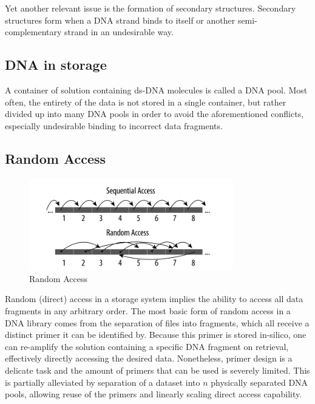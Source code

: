 \documentclass[a4paper,conference]{IEEEtran}
\begin{document}
Yet another relevant issue is the formation of secondary structures. Secondary structures form when a DNA strand binds to itself or another semi-complementary strand in an undesirable way.

\subsection{DNA in storage}
A container of solution containing ds-DNA molecules is called a DNA pool. Most often, the entirety of the data is not stored in a single container, but rather divided up into many DNA pools in order to avoid the aforementioned conflicts, especially undesirable binding to incorrect data fragments.

\subsection{Random Access}
\begin{figure}
\centering
\includegraphics[width=3.5in]{randomaccess}
\caption{Random Access}
\label{randomaccess}
\end{figure}

Random (direct) access in a storage system implies the ability to access all data fragments in any arbitrary order. The most basic form of random access in a DNA library comes from the separation of files into fragments, which all receive a distinct primer it can be identified by. Because this primer is stored in-silico, one can re-amplify the solution containing a specific DNA fragment on retrieval, effectively directly accessing the desired data. Nonetheless, primer design is a delicate task and the amount of primers that can be used is severely limited. This is partially alleviated by separation of a dataset into $n$ physically separated DNA pools, allowing reuse of the primers and linearly scaling direct access capability.



\end{document}
